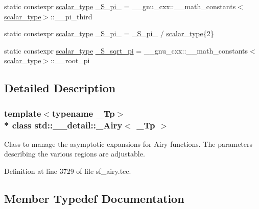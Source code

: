 \begin{DoxyCompactItemize}
\item 
static constexpr \hyperlink{classstd_1_1____detail_1_1__Airy_a266cdfcc86b36c8743fd0e102387e1f0}{scalar\+\_\+type} \hyperlink{classstd_1_1____detail_1_1__Airy_a2050b1922ed0b79c5231ada9dffc77e5}{\+\_\+\+S\+\_\+pi\+\_} = \+\_\+\+\_\+gnu\+\_\+cxx\+::\+\_\+\+\_\+math\+\_\+constants$<$\hyperlink{classstd_1_1____detail_1_1__Airy_a266cdfcc86b36c8743fd0e102387e1f0}{scalar\+\_\+type}$>$\+::\+\_\+\+\_\+pi\+\_\+third
\item 
static constexpr \hyperlink{classstd_1_1____detail_1_1__Airy_a266cdfcc86b36c8743fd0e102387e1f0}{scalar\+\_\+type} \hyperlink{classstd_1_1____detail_1_1__Airy_ab43a77e34022fb3e772ef6504bf9319e}{\+\_\+\+S\+\_\+pi\+\_} = \hyperlink{classstd_1_1____detail_1_1__Airy_a2050b1922ed0b79c5231ada9dffc77e5}{\+\_\+\+S\+\_\+pi\+\_} / \hyperlink{classstd_1_1____detail_1_1__Airy_a266cdfcc86b36c8743fd0e102387e1f0}{scalar\+\_\+type}\{2\}
\item 
static constexpr \hyperlink{classstd_1_1____detail_1_1__Airy_a266cdfcc86b36c8743fd0e102387e1f0}{scalar\+\_\+type} \hyperlink{classstd_1_1____detail_1_1__Airy_abee18aba33b66386e818da9c7f4eeff4}{\+\_\+\+S\+\_\+sqrt\+\_\+pi} = \+\_\+\+\_\+gnu\+\_\+cxx\+::\+\_\+\+\_\+math\+\_\+constants$<$\hyperlink{classstd_1_1____detail_1_1__Airy_a266cdfcc86b36c8743fd0e102387e1f0}{scalar\+\_\+type}$>$\+::\+\_\+\+\_\+root\+\_\+pi
\end{DoxyCompactItemize}


\subsection{Detailed Description}
\subsubsection*{template$<$typename \+\_\+\+Tp$>$\\*
class std\+::\+\_\+\+\_\+detail\+::\+\_\+\+Airy$<$ \+\_\+\+Tp $>$}

Class to manage the asymptotic expansions for Airy functions. The parameters describing the various regions are adjustable. 

Definition at line 3729 of file sf\+\_\+airy.\+tcc.



\subsection{Member Typedef Documentation}
